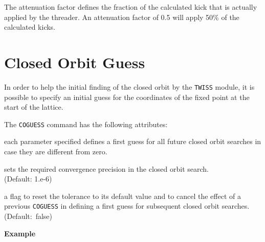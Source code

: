 The attenuation factor defines the fraction of the calculated kick that
is actually applied by the threader.  
An attenuation factor of 0.5 will apply 50\% of the calculated kicks.

\section{Closed Orbit Guess}
\label{sec:coguess}

In order to help the initial finding of the closed orbit by the
\texttt{TWISS} module, it is possible to specify an initial guess for
the coordinates of the fixed point at the start of the lattice.


The \texttt{COGUESS} command has the following attributes:
\begin{madlist}
   each parameter specified defines a first guess for all future closed orbit
  searches in case they are different from zero.  
  
   sets the required convergence precision in the closed
  orbit search. \\ (Default: 1.e-6)  
  
   a flag to reset the tolerance to its default value and to
  cancel the effect of a previous \texttt{COGUESS} in defining a first
  guess for subsequent closed orbit searches. \\ (Default:~false) 

\end{madlist}


\textbf{Example}\\



